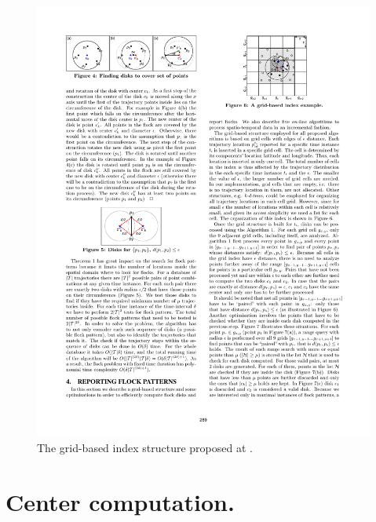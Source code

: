 \documentclass[journal,onecolumn]{IEEEtran}
\begin{document}
\begin{figure}
    \centering
    \includegraphics[clip,trim=13cm 21.75cm 4.1cm 1.85cm]{figures/grid}
    \caption{The grid-based index structure proposed at \cite{vieira_2009}.}\label{fig:grid}
\end{figure}

\newpage 

\appendices
\section{Center computation.}\label{app:centers}
\end{document}
